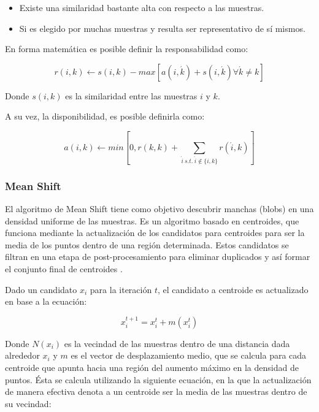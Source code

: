 \begin{itemize}
	
	\item Existe una similaridad bastante alta con respecto a las muestras.
	
	\item Si es elegido por muchas muestras y resulta ser representativo de sí mismos.
\end{itemize}

En forma matemática es posible definir la responsabilidad como:

\begin{equation}	
	r(i, k) \leftarrow s(i, k) - max [ a(i, \acute{k}) + s(i, \acute{k}) \forall \acute{k} \neq k ]
\end{equation}

Donde $s(i,k)$ es la similaridad entre las muestras $i$ y $k$. 

A su vez, la disponibilidad, es posible definirla como:

\begin{equation}
	a(i, k) \leftarrow min [0, r(k, k) + \sum_{\acute{i}~s.t.~\acute{i} \notin \{i, k\}}{r(\acute{i}, k)}]
\end{equation}

\subsubsection{Mean Shift}

El algoritmo de Mean Shift tiene como objetivo descubrir manchas (blobs) en una densidad uniforme de las muestras. Es un algoritmo basado en centroides, que funciona mediante la actualización de los candidatos para centroides para ser la media de los puntos dentro de una región determinada. Estos candidatos se filtran en una etapa de post-procesamiento para eliminar duplicados y así formar el conjunto final de centroides \cite{cheng1995mean}.

Dado un candidato $x_{i}$ para la iteración $t$, el candidato a centroide es actualizado en base a la ecuación:

\begin{equation}
	x_i^{t+1} = x_i^t + m(x_i^t)
\end{equation}

Donde $N (x_i)$ es la vecindad de las muestras dentro de una distancia dada alrededor $x_i$ y $m$ es el vector de desplazamiento medio, que se calcula para cada centroide que apunta hacia una región del aumento máximo en la densidad de puntos. Ésta se calcula utilizando la siguiente ecuación, en la que la actualización de manera efectiva denota a un centroide ser la media de las muestras dentro de su vecindad:

